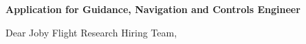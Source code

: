 \documentclass[10pt,a4paper]{article}
\newcommand{\SubjectSize}{10pt}
\newcommand{\BodySize}{9.25pt}
\newcommand{\SubjectLineSize}{11.5pt}
\newcommand{\BodyLineSize}{12.1pt}
\newcommand{\RecipientAfter}{8pt}         %
\newcommand{\SubjectAfter}{42pt}          %
\newcommand{\SalutationAfter}{18pt}       %
\begin{document}
\vspace{\RecipientAfter}

{\fontsize{\SubjectSize}{\SubjectLineSize}\selectfont
    \textbf{\textcolor{CVBlack}{Application for Guidance, Navigation and Controls Engineer}}}

\vspace{\SubjectAfter}

{\fontsize{\BodySize}{\BodyLineSize}\selectfont
    \textcolor{CVDarkGray}{Dear Joby Flight Research Hiring Team,}}


\vspace{\SalutationAfter}
\end{document}
